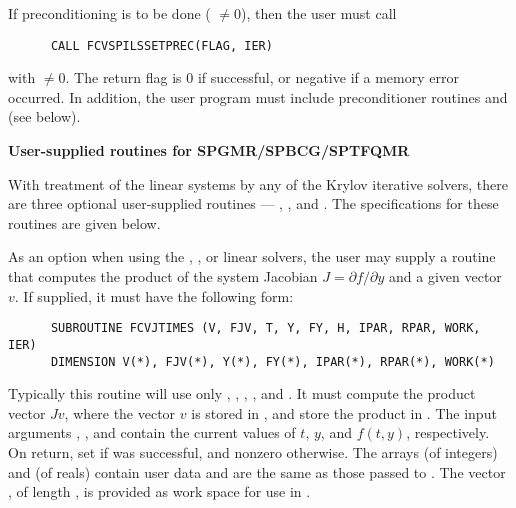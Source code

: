 \begin{Steps}
  If preconditioning is to be done ( $\neq 0$), then the user must call
\begin{verbatim}
      CALL FCVSPILSSETPREC(FLAG, IER)
\end{verbatim}
  with  $\neq 0$.  The return flag  is 0 if
  successful, or negative if a memory error occurred.
  In addition, the user program must include
  preconditioner routines  and  (see below).


 {\s}{\p} {\bf User-supplied routines for SPGMR/SPBCG/SPTFQMR}

  With treatment of the linear systems by any of the Krylov iterative
  solvers, there are three optional user-supplied routines ---
  , , and .  The specifications
  for these routines are given below.

  As an option when using the {\spgmr}, {\spbcg}, or {\sptfqmr}  linear solvers, 
  the user may supply a routine that computes the product of the system Jacobian 
  $J = \partial f / \partial y$ 
  and a given vector $v$.  If supplied, it must have the following form:
\begin{verbatim}
      SUBROUTINE FCVJTIMES (V, FJV, T, Y, FY, H, IPAR, RPAR, WORK, IER)
      DIMENSION V(*), FJV(*), Y(*), FY(*), IPAR(*), RPAR(*), WORK(*)
\end{verbatim}
  Typically this routine will use only , , , , and
  .  It must compute the product vector $Jv$, where the vector $v$ is
  stored in , and store the product in .  
  The input arguments , , and  contain the current
  values of $t$, $y$, and $f(t,y)$, respectively.  On return, set
   if  was successful, and nonzero otherwise.
  The arrays  (of integers) and  (of reals) contain user data
  and are the same as those passed to .
  The vector , of length , is
  provided as work space for use in .


\end{Steps}
